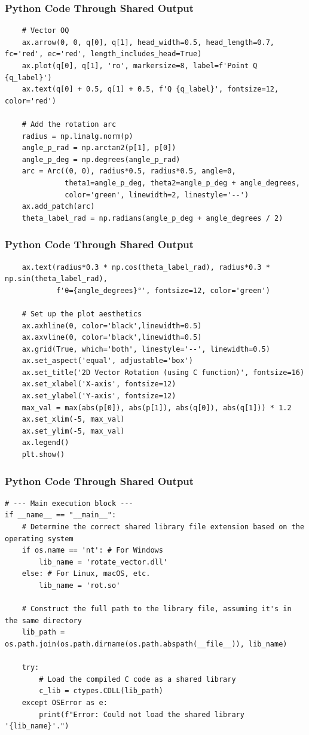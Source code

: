 \documentclass{beamer}
\begin{document}
\begin{frame}[fragile]
\frametitle{Python Code Through Shared Output}
\begin{lstlisting}
    # Vector OQ
    ax.arrow(0, 0, q[0], q[1], head_width=0.5, head_length=0.7, fc='red', ec='red', length_includes_head=True)
    ax.plot(q[0], q[1], 'ro', markersize=8, label=f'Point Q {q_label}')
    ax.text(q[0] + 0.5, q[1] + 0.5, f'Q {q_label}', fontsize=12, color='red')

    # Add the rotation arc
    radius = np.linalg.norm(p)
    angle_p_rad = np.arctan2(p[1], p[0])
    angle_p_deg = np.degrees(angle_p_rad)
    arc = Arc((0, 0), radius*0.5, radius*0.5, angle=0,
              theta1=angle_p_deg, theta2=angle_p_deg + angle_degrees,
              color='green', linewidth=2, linestyle='--')
    ax.add_patch(arc)
    theta_label_rad = np.radians(angle_p_deg + angle_degrees / 2)
    \end{lstlisting}
\end{frame}
\begin{frame}[fragile]
\frametitle{Python Code Through Shared Output}
\begin{lstlisting}
    ax.text(radius*0.3 * np.cos(theta_label_rad), radius*0.3 * np.sin(theta_label_rad),
            f'θ={angle_degrees}°', fontsize=12, color='green')

    # Set up the plot aesthetics
    ax.axhline(0, color='black',linewidth=0.5)
    ax.axvline(0, color='black',linewidth=0.5)
    ax.grid(True, which='both', linestyle='--', linewidth=0.5)
    ax.set_aspect('equal', adjustable='box')
    ax.set_title('2D Vector Rotation (using C function)', fontsize=16)
    ax.set_xlabel('X-axis', fontsize=12)
    ax.set_ylabel('Y-axis', fontsize=12)
    max_val = max(abs(p[0]), abs(p[1]), abs(q[0]), abs(q[1])) * 1.2
    ax.set_xlim(-5, max_val)
    ax.set_ylim(-5, max_val)
    ax.legend()
    plt.show()
\end{lstlisting}
\end{frame}
\begin{frame}[fragile]
\frametitle{Python Code Through Shared Output}
\begin{lstlisting}
# --- Main execution block ---
if __name__ == "__main__":
    # Determine the correct shared library file extension based on the operating system
    if os.name == 'nt': # For Windows
        lib_name = 'rotate_vector.dll'
    else: # For Linux, macOS, etc.
        lib_name = 'rot.so'
    
    # Construct the full path to the library file, assuming it's in the same directory
    lib_path = os.path.join(os.path.dirname(os.path.abspath(__file__)), lib_name)

    try:
        # Load the compiled C code as a shared library
        c_lib = ctypes.CDLL(lib_path)
    except OSError as e:
        print(f"Error: Could not load the shared library '{lib_name}'.")
        \end{lstlisting}
\end{frame}
\end{document}
